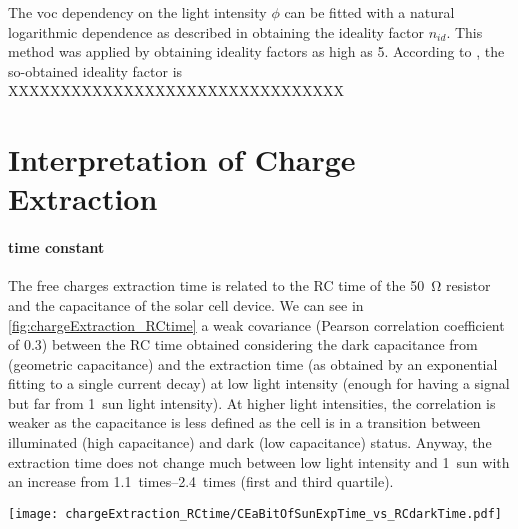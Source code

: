 The \gls{voc} dependency on the light intensity $\phi$ can be fitted with a natural logarithmic dependence as described in  obtaining the ideality factor $n_{id}$. This method was applied by  obtaining ideality factors as high as 5. According to , the so-obtained ideality factor is XXXXXXXXXXXXXXXXXXXXXXXXXXXXXXXX


\section{Interpretation of Charge Extraction}\label{interpretation_ce}
\paragraph{ time constant}
The free charges extraction time is related to the RC time of the \SI{50}{\ohm} resistor and the capacitance of the solar cell device. We can see in \cref{fig:chargeExtraction_RCtime} a weak covariance (Pearson correlation coefficient of 0.3) between the RC time obtained considering the dark capacitance from  (geometric capacitance) and the extraction time (as obtained by an exponential fitting to a single  current decay) at low light intensity (enough for having a signal but far from 1~sun light intensity). At higher light intensities, the correlation is weaker as the capacitance is less defined as the cell is in a transition between illuminated (high capacitance) and dark (low capacitance) status. Anyway, the extraction time does not change much between low light intensity and 1~sun with an increase from \SIrange{1.1}{2.4}{times} (first and third quartile).

\begin{SCfigure}%
	\centering
	\texttt{[image: chargeExtraction\_RCtime/CEaBitOfSunExpTime\_vs\_RCdarkTime.pdf]}
	\label{fig:chargeExtraction_RCtime}
\end{SCfigure}

